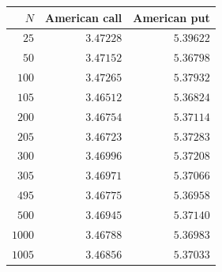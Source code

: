 \begin{tabular}{rrr}
\toprule
$N$ & American call & American put \\
\midrule
$25$ & $3.47228$ & $5.39622$ \\
$50$ & $3.47152$ & $5.36798$ \\
$100$ & $3.47265$ & $5.37932$ \\
$105$ & $3.46512$ & $5.36824$ \\
$200$ & $3.46754$ & $5.37114$ \\
$205$ & $3.46723$ & $5.37283$ \\
$300$ & $3.46996$ & $5.37208$ \\
$305$ & $3.46971$ & $5.37066$ \\
$495$ & $3.46775$ & $5.36958$ \\
$500$ & $3.46945$ & $5.37140$ \\
$1000$ & $3.46788$ & $5.36983$ \\
$1005$ & $3.46856$ & $5.37033$ \\
\bottomrule
\end{tabular}
